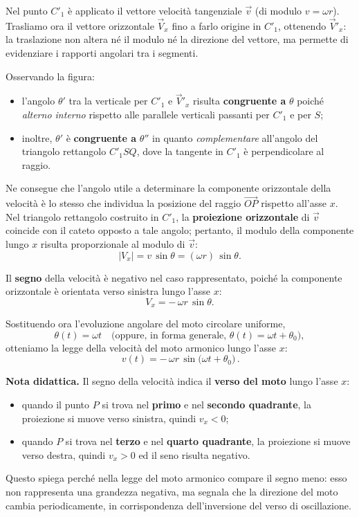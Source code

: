 \documentclass[a4paper,12pt]{article}
\begin{document}
Nel punto $C'_1$ è applicato il vettore velocità tangenziale $\vec v$ (di modulo $v = \omega r$).  
Trasliamo ora il vettore orizzontale $\vec V_x$ fino a farlo origine in $C'_1$, ottenendo $\vec V'_x$: la traslazione non altera né il modulo né la direzione del vettore, ma permette di evidenziare i rapporti angolari tra i segmenti.

Osservando la figura:
\begin{itemize}
  \item l’angolo $\theta'$ tra la verticale per $C'_1$ e $\vec V'_x$ risulta \textbf{congruente a} $\theta$ poiché \emph{alterno interno} rispetto alle parallele verticali passanti per $C'_1$ e per $S$;
  \item inoltre, $\theta'$ è \textbf{congruente a} $\theta''$ in quanto \emph{complementare} all’angolo del triangolo rettangolo $C'_1SQ$, dove la tangente in $C'_1$ è perpendicolare al raggio.
\end{itemize}

Ne consegue che l’angolo utile a determinare la componente orizzontale della velocità è lo stesso che individua la posizione del raggio $\overrightarrow{OP}$ rispetto all’asse $x$.  
Nel triangolo rettangolo costruito in $C'_1$, la \textbf{proiezione orizzontale} di $\vec v$ coincide con il cateto opposto a tale angolo; pertanto, il modulo della componente lungo $x$ risulta proporzionale al modulo di $\vec v$:
\[
|V_x| = v \,\sin\theta = (\omega r)\,\sin\theta.
\]

Il \textbf{segno} della velocità è negativo nel caso rappresentato, poiché la componente orizzontale è orientata verso sinistra lungo l’asse $x$:
\[
V_x = -\,\omega r \,\sin\theta.
\]

Sostituendo ora l’evoluzione angolare del moto circolare uniforme,
\[
\theta(t)=\omega t \quad \text{(oppure, in forma generale, } \theta(t)=\omega t + \theta_0\text{)},
\]
otteniamo la legge della velocità del moto armonico lungo l’asse $x$:
\[
\boxed{\,v(t) = -\,\omega r \,\sin\!\big(\omega t + \theta_0\big)\,}.
\]

\bigskip
\noindent
\textbf{Nota didattica.}  
Il segno della velocità indica il \textbf{verso del moto} lungo l’asse $x$:
\begin{itemize}
  \item quando il punto $P$ si trova nel \textbf{primo} e nel \textbf{secondo quadrante}, la proiezione si muove verso sinistra, quindi $v_x < 0$;
  \item quando $P$ si trova nel \textbf{terzo} e nel \textbf{quarto quadrante}, la proiezione si muove verso destra, quindi $v_x > 0$ ed il seno risulta negativo.
\end{itemize}
Questo spiega perché nella legge del moto armonico compare il segno meno: esso non rappresenta una grandezza negativa, ma segnala che la direzione del moto cambia periodicamente, in corrispondenza dell’inversione del verso di oscillazione.
\newpage
\end{document}
